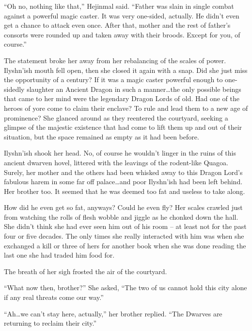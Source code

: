  

“Oh no, nothing like that,” Hejinmal said. “Father was slain in single combat against a powerful magic caster. It was very one-sided, actually. He didn't even get a chance to attack even once. After that, mother and the rest of father’s consorts were rounded up and taken away with their broods. Except for you, of course.”

 

The statement broke her away from her rebalancing of the scales of power. Ilyshn’ish mouth fell open, then she closed it again with a snap. Did she just miss the opportunity of a century? If it was a magic caster powerful enough to one-sidedly slaughter an Ancient Dragon in such a manner…the only possible beings that came to her mind were the legendary Dragon Lords of old. Had one of the heroes of yore come to claim their enclave? To rule and lead them to a new age of prominence? She glanced around as they reentered the courtyard, seeking a glimpse of the majestic existence that had come to lift them up and out of their situation, but the space remained as empty as it had been before.

 

Ilyshn’ish shook her head. No, of course he wouldn’t linger in the ruins of this ancient dwarven hovel, littered with the leavings of the rodent-like Quagoa. Surely, her mother and the others had been whisked away to this Dragon Lord’s fabulous harem in some far off palace…and poor Ilyshn’ish had been left behind. Her brother too. It seemed that he was deemed too fat and useless to take along.

 

How did he even get so fat, anyways? Could he even fly? Her scales crawled just from watching the rolls of flesh wobble and jiggle as he chonked down the hall. She didn’t think she had ever seen him out of his room – at least not for the past four or five decades. The only times she really interacted with him was when she exchanged a kill or three of hers for another book when she was done reading the last one she had traded him food for.

 

The breath of her sigh frosted the air of the courtyard.

 

“What now then, brother?” She asked, “The two of us cannot hold this city alone if any real threats come our way.”

 

“Ah…we can’t stay here, actually,” her brother replied. “The Dwarves are returning to reclaim their city.”

